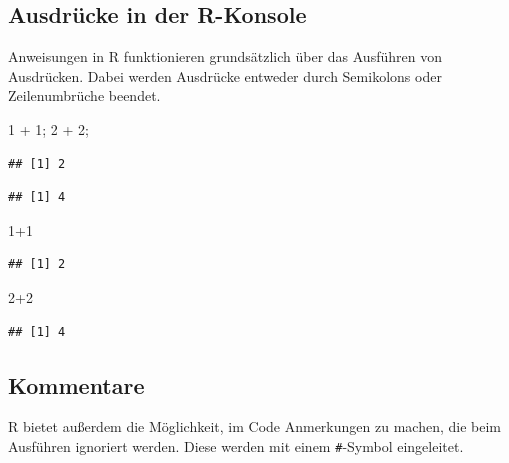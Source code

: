 \documentclass[
]{book}
\newenvironment{Shaded}{\begin{snugshade}}{\end{snugshade}}
\newcommand{\DecValTok}[1]{\textcolor[rgb]{0.00,0.00,0.81}{#1}}
\newcommand{\NormalTok}[1]{#1}
\newcommand{\SpecialCharTok}[1]{\textcolor[rgb]{0.00,0.00,0.00}{#1}}
\begin{document}
\hypertarget{ausdruxfccke-in-der-r-konsole}{%
\subsection*{Ausdrücke in der R-Konsole}\label{ausdruxfccke-in-der-r-konsole}}

Anweisungen in R funktionieren grundsätzlich über das Ausführen von Ausdrücken. Dabei werden Ausdrücke entweder durch Semikolons oder Zeilenumbrüche beendet.

\begin{Shaded}
\begin{Highlighting}[]
\DecValTok{1} \SpecialCharTok{+} \DecValTok{1}\NormalTok{; }\DecValTok{2} \SpecialCharTok{+} \DecValTok{2}\NormalTok{;}
\end{Highlighting}
\end{Shaded}

\begin{verbatim}
## [1] 2
\end{verbatim}

\begin{verbatim}
## [1] 4
\end{verbatim}

\begin{Shaded}
\begin{Highlighting}[]
\DecValTok{1}\SpecialCharTok{+}\DecValTok{1}
\end{Highlighting}
\end{Shaded}

\begin{verbatim}
## [1] 2
\end{verbatim}

\begin{Shaded}
\begin{Highlighting}[]
\DecValTok{2}\SpecialCharTok{+}\DecValTok{2}
\end{Highlighting}
\end{Shaded}

\begin{verbatim}
## [1] 4
\end{verbatim}

\hypertarget{kommentare}{%
\subsection*{Kommentare}\label{kommentare}}

R bietet außerdem die Möglichkeit, im Code Anmerkungen zu machen, die beim Ausführen ignoriert werden. Diese werden mit einem \texttt{\#}-Symbol eingeleitet.
\end{document}
